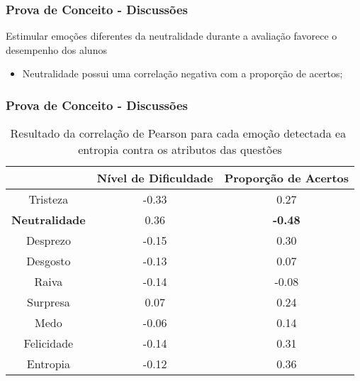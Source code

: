 \begin{frame}
\frametitle{Prova de Conceito - Discussões}
\begin{block}{Estimular emo\c{c}\~oes diferentes da neutralidade durante a avalia\c{c}\~ao favorece o desempenho dos alunos}
\begin{itemize}
\pause
\item Neutralidade possui uma correla\c{c}\~ao negativa com a propor\c{c}\~ao de acertos;
\end{itemize}
\end{block}

\end{frame}

\begin{frame}
\frametitle{Prova de Conceito - Discussões}
\begin{table}[]\footnotesize
\centering
\caption{Resultado​ ​da​ ​correla\c{c}\~ao​ ​de​ ​Pearson​ ​para​ ​cada​ ​emo\c{c}\~ao​ ​detectada
e​ ​a​ ​entropia​ ​contra​ ​os​ ​atributos​ ​das​ ​quest\~oes}
\label{my-label}
\begin{tabular}{|c|c|c|}
\hline
                      & \textbf{Nível de Dificuldade} & \textbf{Proporção de Acertos} \\ \hline
Tristeza	     & -0.33                & 0.27                          \\ \hline
\small \textbf{Neutralidade} & 0.36                 & \small \textbf{-0.48}                \\ \hline
Desprezo     		& -0.15                         & 0.30                 \\ \hline
Desgosto              & -0.13                         & 0.07                          \\ \hline
Raiva                 & -0.14                         & -0.08                         \\ \hline
Surpresa              & 0.07                          & 0.24                          \\ \hline
Medo                  & -0.06                         & 0.14                          \\ \hline
Felicidade   		& -0.14                         & 0.31                 \\ \hline
Entropia     		& -0.12                         & 0.36                 \\ \hline
\end{tabular}
\end{table}
\end{frame}



